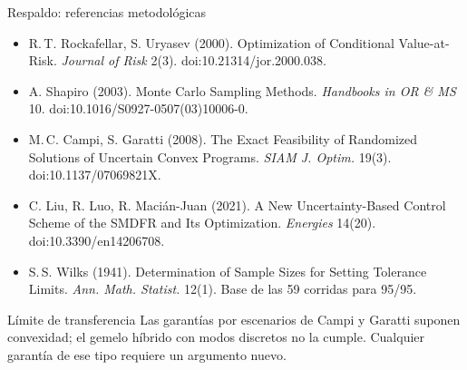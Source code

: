 \documentclass[aspectratio=169,10pt]{beamer}
\begin{document}
\begin{frame}{Respaldo: referencias metodológicas}
\small
\begin{itemize}\setlength{\itemsep}{.2cm}
\item R.\,T. Rockafellar, S. Uryasev (2000). Optimization of Conditional Value-at-Risk. \emph{Journal of Risk} 2(3). doi:10.21314/jor.2000.038.
\item A. Shapiro (2003). Monte Carlo Sampling Methods. \emph{Handbooks in OR \& MS} 10. doi:10.1016/S0927-0507(03)10006-0.
\item M.\,C. Campi, S. Garatti (2008). The Exact Feasibility of Randomized Solutions of Uncertain Convex Programs. \emph{SIAM J. Optim.} 19(3). doi:10.1137/07069821X.
\item C. Liu, R. Luo, R. Macián-Juan (2021). A New Uncertainty-Based Control Scheme of the SMDFR and Its Optimization. \emph{Energies} 14(20). doi:10.3390/en14206708.
\item S.\,S. Wilks (1941). Determination of Sample Sizes for Setting Tolerance Limits. \emph{Ann. Math. Statist.} 12(1). Base de las 59 corridas para 95/95.
\end{itemize}
\vspace{.3cm}
\begin{alertblock}{Límite de transferencia}
Las garantías por escenarios de Campi y Garatti suponen convexidad; el gemelo híbrido con modos discretos no la cumple. Cualquier garantía de ese tipo requiere un argumento nuevo.
\end{alertblock}
\end{frame}
\end{document}
